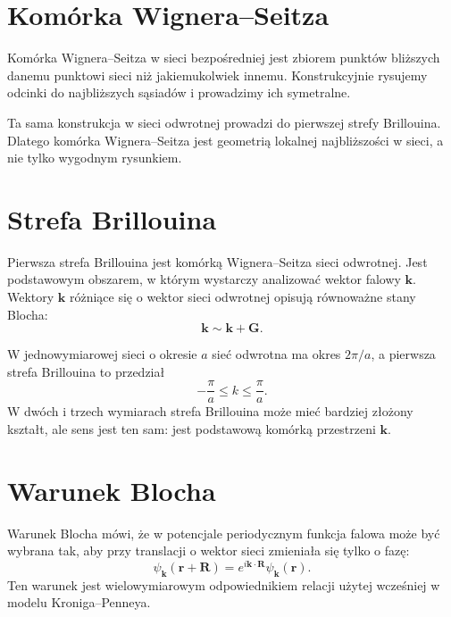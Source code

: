 \section{Komórka Wignera--Seitza}

Komórka Wignera--Seitza w sieci bezpośredniej jest zbiorem punktów bliższych danemu punktowi sieci niż jakiemukolwiek innemu. Konstrukcyjnie rysujemy odcinki do najbliższych sąsiadów i prowadzimy ich symetralne.

Ta sama konstrukcja w sieci odwrotnej prowadzi do pierwszej strefy Brillouina. Dlatego komórka Wignera--Seitza jest geometrią lokalnej najbliższości w sieci, a nie tylko wygodnym rysunkiem.

\section{Strefa Brillouina}

Pierwsza strefa Brillouina jest komórką Wignera--Seitza sieci odwrotnej. Jest podstawowym obszarem, w którym wystarczy analizować wektor falowy \(\mathbf{k}\). Wektory \(\mathbf{k}\) różniące się o wektor sieci odwrotnej opisują równoważne stany Blocha:
\begin{equation}
    \mathbf{k}\sim \mathbf{k}+\mathbf{G}.
\end{equation}

W jednowymiarowej sieci o okresie \(a\) sieć odwrotna ma okres \(2\pi/a\), a pierwsza strefa Brillouina to przedział
\begin{equation}
    -\frac{\pi}{a}\leq k\leq \frac{\pi}{a}.
\end{equation}
W dwóch i trzech wymiarach strefa Brillouina może mieć bardziej złożony kształt, ale sens jest ten sam: jest podstawową komórką przestrzeni \(\mathbf{k}\).

\section{Warunek Blocha}

Warunek Blocha mówi, że w potencjale periodycznym funkcja falowa może być wybrana tak, aby przy translacji o wektor sieci zmieniała się tylko o fazę:
\begin{equation}
    \psi_{\mathbf{k}}(\mathbf{r}+\mathbf{R})=e^{i\mathbf{k}\cdot\mathbf{R}}\psi_{\mathbf{k}}(\mathbf{r}).
\end{equation}
Ten warunek jest wielowymiarowym odpowiednikiem relacji użytej wcześniej w modelu Kroniga--Penneya.

